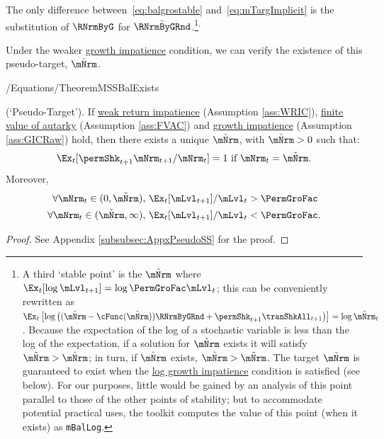 \documentclass[\econtexRoot/BufferStockTheory]{subfiles}
\begin{document}
The only difference between~\eqref{eq:balgrostable} and~\eqref{eq:mTargImplicit} is the substitution of $\RNrmByG$ for $\bar{\RNrmByGRnd}$.\footnote{A third `stable point' is the $\mBalLog$ where $\Ex_{t}[\log \mLvl_{t+1}] = \log \PermGroFac \mLvl_{t}$; this can be conveniently rewritten as $\Ex_{t}\left[\log\left((\mBalLog-\usual{\cFunc}(\mBalLog))\RNrmByGRnd+\permShk_{t+1}\tranShkAll_{t+1}\right)\right]  = \log \mBalLog_{t}$.
Because the expectation of the log of a stochastic variable is less than the log of the expectation, if a solution for $\mBalLog$ exists it will satisfy $\mBalLog > \mBalLvl$; in turn, if $\mTrgNrm$ exists, $\mTrgNrm>\mBalLog$.
The target $\mBalLog$ is guaranteed to exist when the \hyperlink{GICSdl}{log growth impatience} condition is satisfied (see below).
For our purposes, little would be gained by an analysis of this point parallel to those of the other points of stability; but to accommodate potential practical uses,  the {\ARKurl} toolkit computes the value of this point (when it exists) as \texttt{mBalLog}.}$^{,}$


Under the weaker  \hyperlink{GICRaw}{growth impatience} condition, we can verify the existence of this pseudo-target, $\mBalLvl$.

\begin{verbatimwrite}{\econtexRoot/Equations/TheoremMSSBalExists}
  \begin{theorem}(`Pseudo-Target').
If \hyperlink{WRIC}{weak return impatience} (Assumption \ref{ass:WRIC}), \hyperlink{FVAC}{finite value of autarky} (Assumption \ref{ass:FVAC}) and \hyperlink{GICRaw}{growth impatience} (Assumption \ref{ass:GICRaw}) hold, then there exists a unique $\mBalLvl$, with $\mBalLvl>0$ such that:
    \begin{equation}
      \Ex_t [\permShk_{t+1}{\mNrm}_{t+1}/\mNrm_t] = 1 \mbox{~if~} \mNrm_t = \mBalLvl.
      \label{eq:mBalLvl}
    \end{equation}
    Moreover,
    \begin{equation}
      \label{eq:stabilityStE}
      \begin{aligned}
        \forall {\mNrm}_t\in(0,\mBalLvl),      \,\,& \Ex_{t}[\mLvl_{t+1}]/\mLvl_{t} > \PermGroFac \\
        \forall {\mNrm}_t\in(\mBalLvl,\infty), \,\,& \Ex_{t}[\mLvl_{t+1}]/\mLvl_{t} < \PermGroFac.
      \end{aligned}
    \end{equation}
  \end{theorem}
\end{verbatimwrite} \unskip

\begin{proof}
See Appendix \ref{subsubsec:AppxPseudoSS} for the proof.

\end{proof}
\end{document}

